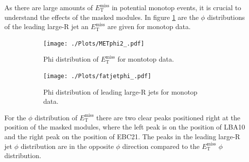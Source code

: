 As there are large amounts of $E_{\mathrm{T}}^{\mathrm{miss}}$ in potential monotop events, it is crucial to understand the effects of the masked modules. 
In figure \ref{Phi} are the $\phi$ distributions of the leading large-R jet an $E_{\mathrm{T}}^{\mathrm{miss}}$ are given for monotop data.
\begin{figure}
	\centering
	\begin{subfigure}{0.45\textwidth}
		\texttt{[image: ./Plots/METphi2\_.pdf]}
		\caption{Phi distribution of $E_{\mathrm{T}}^{\mathrm{miss}}$ for montotop data.}
	\end{subfigure}
	\begin{subfigure}{0.45\textwidth}
		\texttt{[image: ./Plots/fatjetphi\_.pdf]}
		\caption{Phi distribution of leading large-R jets for monotop data.}
	\end{subfigure}
	\caption{}\label{Phi}
\end{figure}
For the $\phi$ distribution of $E_{\mathrm{T}}^{\mathrm{miss}}$ there are two clear peaks positioned right at the position of the masked modules, where the left peak is on the position of LBA10 and the right peak on the position of EBC21.
The peaks in the leading large-R jet $\phi$ distribution are in the opposite $\phi$ direction compared to the $E_{\mathrm{T}}^{\mathrm{miss}}$ $\phi$ distribution. 


